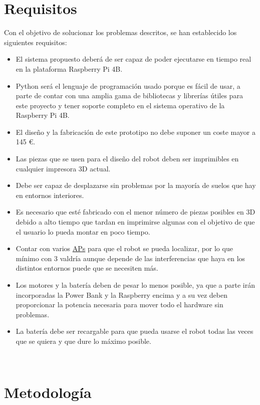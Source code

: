 \section{Requisitos}
\label{sec:requisitos}

Con el objetivo de solucionar los problemas descritos, se han establecido los siguientes requisitos:

\begin{itemize}
 \item \textit{} El sistema propuesto deberá de ser capaz de poder ejecutarse en tiempo real en la plataforma Raspberry Pi 4B.
 \item \textit{} Python será el lenguaje de programación usado porque es fácil de usar, a parte de contar con una amplia gama de bibliotecas 
 y librerías útiles para este proyecto y tener soporte completo en el sistema operativo de la Raspberry Pi 4B.
 \item \textit{} El diseño y la fabricación de este prototipo no debe suponer un coste mayor a 145 \euro.
 \item \textit{} Las piezas que se usen para el diseño del robot deben ser imprimibles en cualquier impresora 3D actual.
 \item \textit{} Debe ser capaz de desplazarse sin problemas por la mayoría de suelos que hay en entornos interiores.
 \item \textit{} Es necesario que esté fabricado con el menor número de piezas posibles en 3D debido a alto tiempo que tardan en imprimirse algunas
 con el objetivo de que el usuario lo pueda montar en poco tiempo.
 \item \textit{} Contar con varios \hyperlink{APs}{APs} para que el robot se pueda localizar, por lo que mínimo con 3 valdría aunque depende de las interferencias que haya en los distintos entornos puede que se necesiten más.
 \item \textit{} Los motores y la batería deben de pesar lo menos posible, ya que a parte irán incorporadas la Power Bank y la Raspberry encima y a su vez deben proporcionar la potencia necesaria para mover todo el hardware sin problemas.
 \item \textit{} La batería debe ser recargable para que pueda usarse el robot todas las veces que se quiera y que dure lo máximo posible.
 
\end{itemize}\

 
\section{Metodología}
\label{sec:metodologia}

